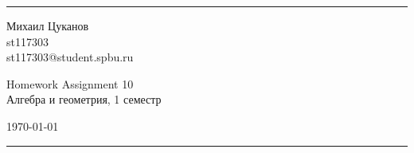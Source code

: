 \documentclass[a4paper, 12pt]{article}
\begin{document}

\fancyhead[C]{}
\hrule \medskip %
\begin{minipage}{0.295\textwidth}
\raggedright\footnotesize
Михаил Цуканов \hfill\\
st117303 \hfill\\
st117303@student.spbu.ru
\end{minipage}
\begin{minipage}{0.4\textwidth}
\centering\large
Homework Assignment 10\\
\normalsize
Алгебра и геометрия, 1 семестр\\
\end{minipage}
\begin{minipage}{0.295\textwidth}
\raggedleft
\today\hfill\\
\end{minipage}
\medskip\hrule
\bigskip

\end{document}
